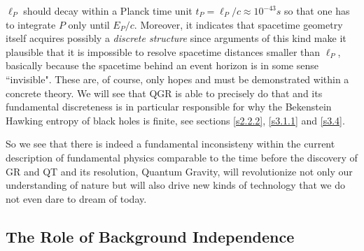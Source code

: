 \documentclass[12pt]{report}
\begin{document}
\begin{itemize}
$\ell_P$ should decay within a Planck time unit $t_P=\ell_P/c\approx
10^{-43}s$ so that one has to integrate $P$ only until $E_P/c$. Moreover,
it indicates that spacetime geometry itself acquires possibly a {\it 
discrete structure} since arguments of this kind make it plausible that it 
is impossible to resolve 
spacetime distances smaller than $\ell_P$, basically because the 
spacetime behind an event horizon is in some sense ``invisible". These 
are, of course, only 
hopes and must be demonstrated within a concrete theory. We will see 
that QGR is able to precisely do that and its fundamental discreteness 
is in particular responsible for why the Bekenstein Hawking entropy
of black holes is finite, see sections \ref{s2.2.2}, \ref{s3.1.1} and 
\ref{s3.4}. 
%
\end{itemize}
%
So we see that there is indeed a fundamental inconsisteny within the 
current description of fundamental physics comparable to the time 
before the discovery of GR and QT and its resolution, Quantum
Gravity, will revolutionize not only our understanding of nature but will
also drive new kinds of technology that we do not even dare to dream 
of today.


\subsection{The Role of Background Independence}
\label{s1.1.2}
\end{document}
